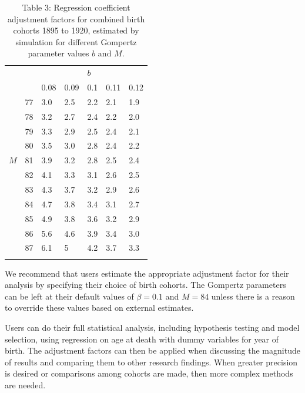 \documentclass[
  11pt,
]{article}
\begin{document}
\begin{table}[H]
\begin{center}
\begin{tabular}{@{}lllllll@{}}
\toprule
    &                         &      &   &   $b$  &      &      \\
    &                         & 0.08 & 0.09 & 0.1 & 0.11 & 0.12 \\ \cmidrule(l){2-7} 
    & \multicolumn{1}{l|}{77} & 3.0    & 2.5  & 2.2 & 2.1  & 1.9  \\
    & \multicolumn{1}{l|}{78} & 3.2  & 2.7  & 2.4 & 2.2  & 2.0  \\
    & \multicolumn{1}{l|}{79} & 3.3  & 2.9  & 2.5 & 2.4  & 2.1  \\
    & \multicolumn{1}{l|}{80} & 3.5  & 3.0  & 2.8 & 2.4  & 2.2  \\
$M$ & \multicolumn{1}{l|}{81} & 3.9  & 3.2  & 2.8 & 2.5  & 2.4  \\
    & \multicolumn{1}{l|}{82} & 4.1  & 3.3  & 3.1 & 2.6  & 2.5  \\
    & \multicolumn{1}{l|}{83} & 4.3  & 3.7  & 3.2 & 2.9  & 2.6  \\
    & \multicolumn{1}{l|}{84} & 4.7  & 3.8  & 3.4 & 3.1  & 2.7  \\
    & \multicolumn{1}{l|}{85} & 4.9  & 3.8  & 3.6 & 3.2  & 2.9  \\
    & \multicolumn{1}{l|}{86} & 5.6  & 4.6  & 3.9 & 3.4  & 3.0    \\
    & \multicolumn{1}{l|}{87} & 6.1  & 5    & 4.2 & 3.7  & 3.3  \\
    &                         &      &      &     &      &      \\ \bottomrule
\end{tabular}
\end{center}
\caption*{Table 3: Regression coefficient adjustment factors for combined birth
cohorts 1895 to 1920, estimated by simulation for different
Gompertz parameter values $b$ and $M$.}
\end{table}

We recommend that users estimate the appropriate adjustment factor for
their analysis by specifying their choice of birth cohorts. The Gompertz
parameters can be left at their default values of \(\beta = 0.1\) and
\(M = 84\) unless there is a reason to override these values based on
external estimates.

Users can do their full statistical analysis, including hypothesis
testing and model selection, using regression on age at death with dummy
variables for year of birth. The adjustment factors can then be applied
when discussing the magnitude of results and comparing them to other
research findings. When greater precision is desired or comparisons
among cohorts are made, then more complex methods are needed.
\end{document}
